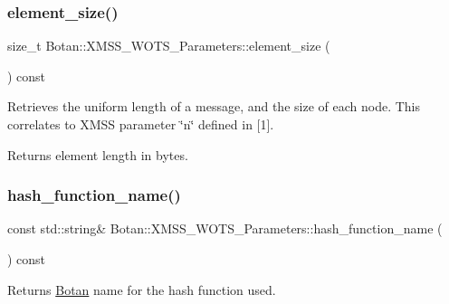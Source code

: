 \subsubsection{\texorpdfstring{element\+\_\+size()}{element\_size()}}
{\footnotesize\ttfamily size\+\_\+t Botan\+::\+X\+M\+S\+S\+\_\+\+W\+O\+T\+S\+\_\+\+Parameters\+::element\+\_\+size (\begin{DoxyParamCaption}{ }\end{DoxyParamCaption}) const\hspace{0.3cm}{\ttfamily [inline]}}

Retrieves the uniform length of a message, and the size of each node. This correlates to X\+M\+SS parameter \char`\"{}n\char`\"{} defined in \mbox{[}1\mbox{]}.

\begin{DoxyReturn}{Returns}
element length in bytes. 
\end{DoxyReturn}
\mbox{\label{class_botan_1_1_x_m_s_s___w_o_t_s___parameters_af21ced80c6176475b613ab966811e6aa}} 
\subsubsection{\texorpdfstring{hash\+\_\+function\+\_\+name()}{hash\_function\_name()}}
{\footnotesize\ttfamily const std\+::string\& Botan\+::\+X\+M\+S\+S\+\_\+\+W\+O\+T\+S\+\_\+\+Parameters\+::hash\+\_\+function\+\_\+name (\begin{DoxyParamCaption}{ }\end{DoxyParamCaption}) const\hspace{0.3cm}{\ttfamily [inline]}}

\begin{DoxyReturn}{Returns}
\hyperlink{namespace_botan}{Botan} name for the hash function used. 
\end{DoxyReturn}
\mbox{\label{class_botan_1_1_x_m_s_s___w_o_t_s___parameters_a8ab4c1563ea45a0a612580f52b99ccd6}} 
